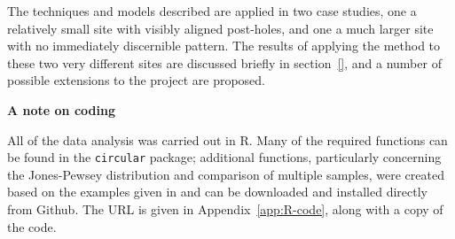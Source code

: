 \documentclass[../../ArchStats.tex]{subfiles}
\begin{document}
The techniques and models described are applied in two case studies, one a relatively small site with visibly aligned post-holes, and one a much larger site with no immediately discernible pattern. The results of applying the method to these two very different sites are discussed briefly in section~\ref{}, and a number of possible extensions to the project are proposed.


\textbf{A note on coding}

All of the data analysis was carried out in R. Many of the required functions can be found in the \texttt{circular} package; additional functions, particularly concerning the Jones-Pewsey distribution and comparison of multiple samples, were created based on the examples given in \cite{Pewsey2014} and can be downloaded and installed directly from Github. The URL is given in Appendix~\ref{app:R-code}, along with a copy of the code.
\end{document}
